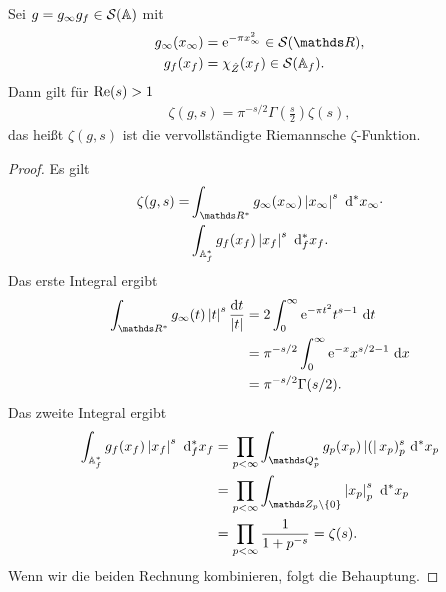 \begin{prop}
Sei $g=g_\infty g_f \in \mathcal{S}(\mathbb{A})$ mit
\begin{align*}
g_\infty(x_\infty)&=\ex^{-\pi x_\infty^2} \in \mathcal{S}(\R),\\
g_f(x_f)&=\chi_{\hat{Z}}(x_f) \in \mathcal{S}(\A_f).
\end{align*}
Dann gilt für $\operatorname{Re}(s)>1$
\begin{align*}
\zeta(g,s)=\pi^{-s/2} \Gamma(\frac{s}{2})\zeta(s),
\end{align*}
das heißt $\zeta(g,s)$ ist die vervollständigte Riemannsche $\zeta$-Funktion.
\end{prop}
\begin{proof}
Es gilt
\begin{align*}
\zeta(g,s)=&\int_{\R^\ast} g_\infty(x_\infty)\abs{x_\infty}^s~\mathrm{d}^\ast x_\infty \cdot\\
&\int_{\A_f^\ast} g_f(x_f)\abs{x_f}^s~\mathrm{d}_f^\ast x_f.
\end{align*}
Das erste Integral ergibt
\begin{align*}
\int_{\R^\ast} g_\infty(t) \abs{t}^s \frac{\mathrm{d}t}{\abs{t}}&=2\int_0^\infty \mathrm{e}^{-\pi t^2} t^{s-1}~\mathrm{d}t\\
&=\pi^{-s/2} \int_0^\infty \ex^{-x} x^{s/2-1}~\mathrm{d}x\\
&=\pi^{-s/2} \Gamma(s/2).
\end{align*}
Das zweite Integral ergibt
\begin{align*}
\int_{\A_f^\ast} g_f(x_f)\abs{x_f}^s~\mathrm{d}_f^\ast x_f&=\prod_{p<\infty} \int_{\Q_p^\ast} g_p(x_p)\abs(x_p)_p^s ~\mathrm{d}^\ast x_p\\
&=\prod_{p<\infty} \int_{\Z_p \setminus \{0\}} \abs{x_p}_p^s~\mathrm{d}^\ast x_p\\
&=\prod_{p<\infty} \frac{1}{1+p^{-s}}=\zeta(s).
\end{align*}
Wenn wir die beiden Rechnung kombinieren, folgt die Behauptung.
\end{proof}

